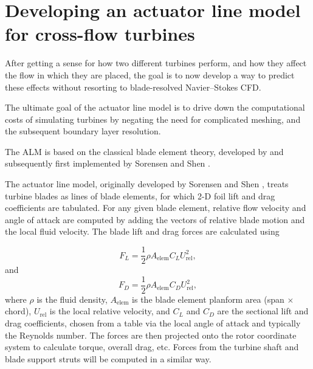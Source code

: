\chapter{Developing an actuator line model for cross-flow turbines}

After getting a sense for how two different turbines perform, and how they
affect the flow in which they are placed, the goal is to now develop a way to
predict these effects without resorting to blade-resolved Navier--Stokes CFD.

The ultimate goal of the actuator line model is to drive down the computational
costs of simulating turbines by negating the need for complicated meshing, and
the subsequent boundary layer resolution.

The ALM is based on the classical blade element theory, developed by
and subsequently first implemented by Sorensen and Shen \cite{Sorensen2002}.


The actuator line model, originally developed by Sorensen and Shen
\cite{Sorensen2002}, treats turbine blades as lines of blade elements, for which
2-D foil lift and drag coefficients are tabulated. For any given blade element,
relative flow velocity and angle of attack are computed by adding the vectors
of relative blade motion and the local fluid velocity. The blade lift and drag
forces are calculated using

\begin{equation}
F_L = \frac{1}{2} \rho A_\mathrm{elem} C_L U_\mathrm{rel}^2,
\end{equation}
and
\begin{equation}
F_D = \frac{1}{2} \rho A_\mathrm{elem} C_D U_\mathrm{rel}^2,
\end{equation}
where $\rho$ is the fluid density, $A_\mathrm{elem}$ is the blade element
planform area (span $\times$ chord), $U_\mathrm{rel}$ is the local relative
velocity, and $C_L$ and $C_D$ are the sectional lift and drag coefficients,
chosen from a table via the local angle of attack and typically the Reynolds
number. The forces are then projected onto the rotor coordinate system to
calculate torque, overall drag, etc. Forces from the turbine shaft and blade
support struts will be computed in a similar way.

